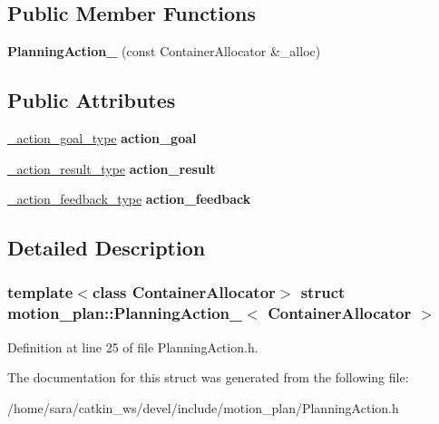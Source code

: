 \subsection*{Public Member Functions}
\begin{DoxyCompactItemize}
\item 
\mbox{\label{structmotion__plan_1_1PlanningAction___a1763b5ceb81ba4d307fae9ede22ff31b}} 
{\bfseries Planning\+Action\+\_\+} (const Container\+Allocator \&\+\_\+alloc)
\end{DoxyCompactItemize}
\subsection*{Public Attributes}
\begin{DoxyCompactItemize}
\item 
\mbox{\label{structmotion__plan_1_1PlanningAction___a20ff1992e2d4bf3f91a49c77a8aac391}} 
\hyperlink{structmotion__plan_1_1PlanningActionGoal__}{\+\_\+action\+\_\+goal\+\_\+type} {\bfseries action\+\_\+goal}
\item 
\mbox{\label{structmotion__plan_1_1PlanningAction___a3950299e6c12012428904fd7b0750054}} 
\hyperlink{structmotion__plan_1_1PlanningActionResult__}{\+\_\+action\+\_\+result\+\_\+type} {\bfseries action\+\_\+result}
\item 
\mbox{\label{structmotion__plan_1_1PlanningAction___a2de3ee740c932b5696e2deaa21cc5ac6}} 
\hyperlink{structmotion__plan_1_1PlanningActionFeedback__}{\+\_\+action\+\_\+feedback\+\_\+type} {\bfseries action\+\_\+feedback}
\end{DoxyCompactItemize}


\subsection{Detailed Description}
\subsubsection*{template$<$class Container\+Allocator$>$\newline
struct motion\+\_\+plan\+::\+Planning\+Action\+\_\+$<$ Container\+Allocator $>$}



Definition at line 25 of file Planning\+Action.\+h.



The documentation for this struct was generated from the following file\+:\begin{DoxyCompactItemize}
\item 
/home/sara/catkin\+\_\+ws/devel/include/motion\+\_\+plan/Planning\+Action.\+h\end{DoxyCompactItemize}
